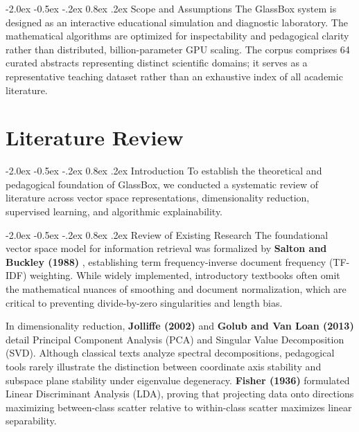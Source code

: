 \documentclass[12pt,a4paper]{report}
\makeatletter
\renewcommand\section{\@startsection {section}{1}{\z@}%
                                   {-2.0ex \@plus -0.5ex \@minus -.2ex}%
                                   {0.8ex \@plus.2ex}%
                                   {\normalfont\fontsize{14}{17}\bfseries\color{headerblue}}}
\makeatother
\begin{document}
\section{Scope and Assumptions}
The GlassBox system is designed as an interactive educational simulation and diagnostic laboratory. The mathematical algorithms are optimized for inspectability and pedagogical clarity rather than distributed, billion-parameter GPU scaling. The corpus comprises 64 curated abstracts representing distinct scientific domains; it serves as a representative teaching dataset rather than an exhaustive index of all academic literature.

\chapter{Literature Review}

\section{Introduction}
To establish the theoretical and pedagogical foundation of GlassBox, we conducted a systematic review of literature across vector space representations, dimensionality reduction, supervised learning, and algorithmic explainability.

\section{Review of Existing Research}
The foundational vector space model for information retrieval was formalized by \textbf{Salton and Buckley (1988)} \cite{salton1988}, establishing term frequency-inverse document frequency (TF-IDF) weighting. While widely implemented, introductory textbooks often omit the mathematical nuances of smoothing and document normalization, which are critical to preventing divide-by-zero singularities and length bias.

In dimensionality reduction, \textbf{Jolliffe (2002)} \cite{jolliffe2002} and \textbf{Golub and Van Loan (2013)} \cite{golub2013} detail Principal Component Analysis (PCA) and Singular Value Decomposition (SVD). Although classical texts analyze spectral decompositions, pedagogical tools rarely illustrate the distinction between coordinate axis stability and subspace plane stability under eigenvalue degeneracy. \textbf{Fisher (1936)} \cite{fisher1936} formulated Linear Discriminant Analysis (LDA), proving that projecting data onto directions maximizing between-class scatter relative to within-class scatter maximizes linear separability.
\end{document}

